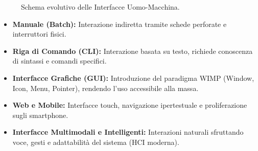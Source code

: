 \vspace{0.5cm}
\begin{figure}[h!]
    \centering
    \caption{Schema evolutivo delle Interfacce Uomo-Macchina.}
\end{figure}
\vspace{0.5cm}

\begin{itemize}
    \item \textbf{Manuale (Batch):} Interazione indiretta tramite schede perforate e interruttori fisici.
    \item \textbf{Riga di Comando (CLI):} Interazione basata su testo, richiede conoscenza di sintassi e comandi specifici.
    \item \textbf{Interfacce Grafiche (GUI):} Introduzione del paradigma WIMP (Window, Icon, Menu, Pointer), rendendo l'uso accessibile alla massa.
    \item \textbf{Web e Mobile:} Interfacce touch, navigazione ipertestuale e proliferazione sugli smartphone.
    \item \textbf{Interfacce Multimodali e Intelligenti:} Interazioni naturali sfruttando voce, gesti e adattabilità del sistema (HCI moderna).
\end{itemize}

